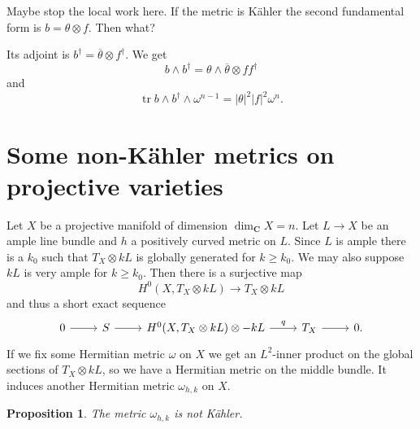 \documentclass[12pt]{amsart}
\newtheorem{prop}[theo]{Proposition}
\theoremstyle{definition}
\def\ov#1{\overline{#1}}
\def\CC{\mathbf{C}}
\DeclareMathOperator{\tr}{tr}
\begin{document}
Maybe stop the local work here.
If the metric is K\"ahler the second fundamental form is $b = \theta \otimes f$.
Then what?



Its adjoint is $b^\dagger = \ov\theta \otimes f^\dagger$.
We get
\[
b \wedge b^\dagger
= \theta \wedge \ov\theta \otimes f f^\dagger
\]
and
\[
\tr b \wedge b^\dagger \wedge \omega^{n-1}
= |\theta|^2 |f|^2 \omega^n.
\]


\section{Some non-K\"ahler metrics on projective varieties}

Let $X$ be a projective manifold of dimension $\dim_{\CC} X = n$.
Let $L \to X$ be an ample line bundle and $h$ a positively curved metric on $L$.
Since $L$ is ample there is a $k_0$ such that $T_X \otimes kL$ is globally generated for $k \geq k_0$.
We may also suppose $kL$ is very ample for $k \geq k_0$.
Then there is a surjective map
\[
H^0(X, T_X \otimes kL) 
\longrightarrow T_X \otimes kL
\]
and thus a short exact sequence
\[
\begin{tikzcd}
0 \ar[r] &
S \ar[r] &
H^0(X, T_X \otimes kL) \otimes -kL \ar[r,"q"] &
T_X \ar[r] &
0.
\end{tikzcd}
\]
If we fix some Hermitian metric $\omega$ on $X$ we get an $L^2$-inner product on the global sections of $T_X \otimes kL$, so we have a Hermitian metric on the middle bundle.
It induces another Hermitian metric $\omega_{h,k}$ on $X$.



\begin{prop}
The metric $\omega_{h,k}$ is not K\"ahler.
\end{prop}
\end{document}
